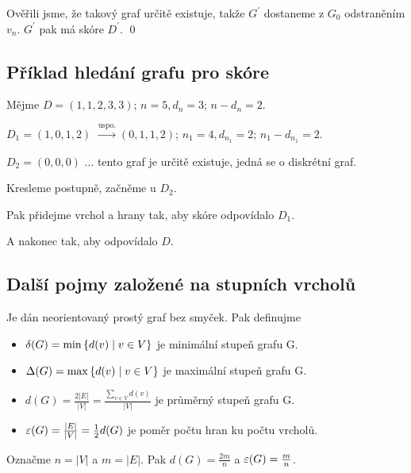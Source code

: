 Ověřili jsme, že takový graf určitě existuje, takže $G^\prime$ dostaneme z $G_0$ odstraněním $v_n$. $G^\prime$ pak má 
skóre $D^\prime$. 
\hspace{\fill}\qed

\subsection{Příklad hledání grafu pro skóre}
Mějme $D = (1,1,2,3,3)$; $n=5, d_n=3$; $n-d_n=2$.

$D_1 = (1,0,1,2)$ $\overset{\text{uspo.}}{\rightarrow} (0,1,1,2)$; $n_1=4, d_{n_1} = 2$; $n_1 - d_{n_1}=2$.

$D_2 = (0, 0, 0)$ $\dots$ tento graf je určitě existuje, jedná se o diskrétní graf.

Kresleme postupně, začněme u $D_2$.
\begin{figure}[H]
\end{figure}
Pak přidejme vrchol a hrany tak, aby skóre odpovídalo $D_1$.
\begin{figure}[H]
\end{figure}
A nakonec tak, aby odpovídalo $D$.
\begin{figure}[H]
\end{figure}

\subsection{Další pojmy založené na stupních vrcholů}
 Je dán neorientovaný prostý graf bez smyček. Pak definujme
\begin{itemize}
    \item $\delta(G) = \min\left\lbrace d(v) \mid v \in V \right\rbrace$ je minimální stupeň grafu G.
    \item $\Delta(G) = \max\left\lbrace d(v) \mid v \in V \right\rbrace$ je maximální stupeň grafu G.
    \item $d(G) = \frac{2|E|}{|V|} = \frac{\sum_{v \in V} d(v)}{|V|}$ je průměrný stupeň grafu G.
    \item $\varepsilon(G) = \frac{|E|}{|V|} = \frac{1}{2}d(G)$ je poměr počtu hran ku počtu vrcholů.
\end{itemize}
Označme $n = |V|$ a $m = |E|$. Pak $d(G) = \frac{2m}{n}$ a $\varepsilon(G) = \frac{m}{n}$. 

